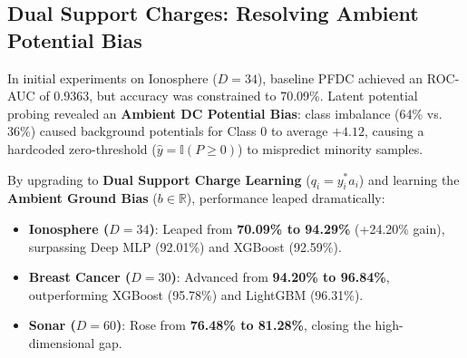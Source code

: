 \documentclass[11pt,a4paper]{article}
\begin{document}
\begin{table}[t]
\centering
\small
\caption{5-Fold Cross-Validation Accuracy (\%) Across 6 Real-World Benchmarks.}
\label{tab:multidataset_6}
\end{table}

\subsection{Dual Support Charges: Resolving Ambient Potential Bias}
In initial experiments on Ionosphere ($D=34$), baseline PFDC achieved an ROC-AUC of 0.9363, but accuracy was constrained to 70.09\%. Latent potential probing revealed an \textbf{Ambient DC Potential Bias}: class imbalance (64\% vs. 36\%) caused background potentials for Class 0 to average $+4.12$, causing a hardcoded zero-threshold ($\hat{y} = \mathbb{I}(P \ge 0)$) to mispredict minority samples. 

By upgrading to \textbf{Dual Support Charge Learning} ($q_i = y_i^* a_i$) and learning the \textbf{Ambient Ground Bias} ($b \in \mathbb{R}$), performance leaped dramatically:
\begin{itemize}
    \item \textbf{Ionosphere ($D=34$)}: Leaped from \textbf{70.09\% to 94.29\%} (+24.20\% gain), surpassing Deep MLP (92.01\%) and XGBoost (92.59\%).
    \item \textbf{Breast Cancer ($D=30$)}: Advanced from \textbf{94.20\% to 96.84\%}, outperforming XGBoost (95.78\%) and LightGBM (96.31\%).
    \item \textbf{Sonar ($D=60$)}: Rose from \textbf{76.48\% to 81.28\%}, closing the high-dimensional gap.
\end{itemize}
\end{document}
